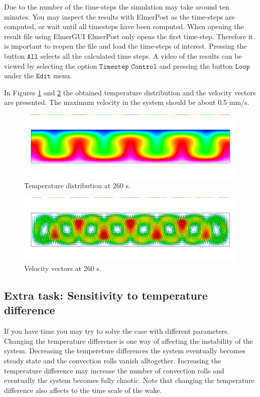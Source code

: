 Due to the number of the time-steps the simulation may take around ten minutes.
You may inspect the results with ElmerPost as the time-steps are computed, or
wait until all timesteps have been computed. 
When opening the result file using ElmerGUI ElmerPost only opens the first time-step.
Therefore it is important to reopen the file and load the time-steps of interest.
Pressing the button $\texttt{All}$ selects all the calculated time steps.
A video of the results can be viewed by selecting the option $\texttt{Timestep}$ 
$\texttt{Control}$ and pressing the button $\texttt{Loop}$ under the $\texttt{Edit}$ menu.

In Figures \ref{fg:rb_temp} and \ref{fg:rb_vel} the obtained temperature 
distribution and the velocity vectors are presented. 
The maximum velocity in the system should be about 0.5 mm/s. 

\begin{figure}[h]
\centering
\includegraphics[width=15cm, viewport=0 50 1000 250,clip]{rb_temp}
\caption{Temperature distribution at 260 s.}\label{fg:rb_temp}
\end{figure} 

\begin{figure}[h]
\centering
\includegraphics[width=15cm, viewport=0 50 1000 250,clip]{rb_velo}
\caption{Velocity vectors at 260 s.}\label{fg:rb_vel}
\end{figure} 



\subsection*{Extra task: Sensitivity to temperature difference}

If you have time you may try to solve the case with different parameters. Changing the temperature difference
is one way of affecting the instability of the system. Decreasing the tempereture differences the system eventually becomes 
steady state and the convection rolls vanish alltogether. Increasing the temperature difference may increase the 
number of convection rolls and eventually the system becomes fully chaotic. Note that changing the temperature difference
also affects to the time scale of the wake. 

\hfill